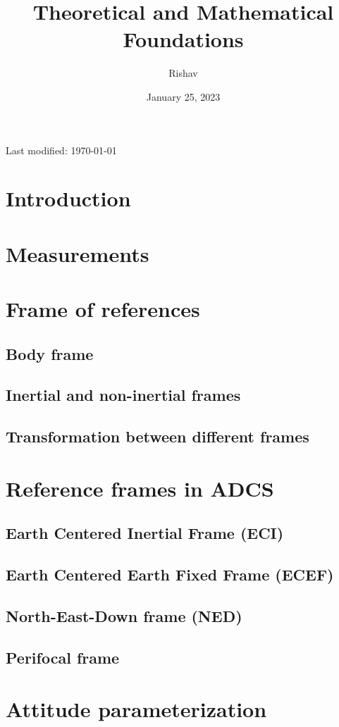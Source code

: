 \documentclass{article}
\title{Theoretical and Mathematical Foundations}
\author{Rishav}
\date{January 25, 2023}
\begin{document}
\maketitle
Last modified: \today

\newpage
\tableofcontents

\section{Introduction}
\section{Measurements}

\section{Frame of references}
\subsection{Body frame}
\subsection{Inertial and non-inertial frames}
\subsection{Transformation between different frames}

\section{Reference frames in ADCS}
\subsection{Earth Centered Inertial Frame (ECI)}
\subsection{Earth Centered Earth Fixed Frame (ECEF)}
\subsection{North-East-Down frame (NED)}
\subsection{Perifocal frame}

\section{Attitude parameterization}
\end{document}
